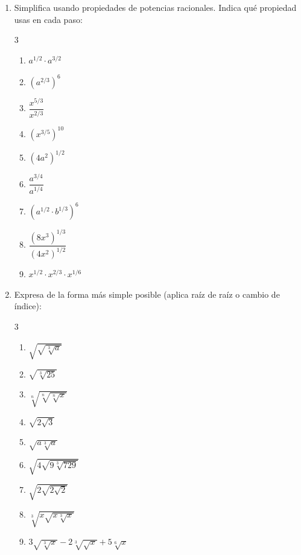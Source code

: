 \documentclass[11pt, letterpaper]{article}
\begin{document}
\begin{enumerate}[label=\textbf{\arabic*.}, leftmargin=*, resume]
  \item Simplifica usando propiedades de potencias racionales. Indica qué propiedad usas en cada paso:
  \begin{multicols}{3}
  \begin{enumerate}[label=\alph*)]
    \item $a^{1/2}\cdot a^{3/2}$
    \item $(a^{2/3})^6$
    \item $\dfrac{x^{5/3}}{x^{2/3}}$
    \item $(x^{3/5})^{10}$
    \item $(4a^2)^{1/2}$
    \item $\dfrac{a^{3/4}}{a^{1/4}}$
    \item $(a^{1/2}\cdot b^{1/3})^6$
    \item $\dfrac{(8x^3)^{1/3}}{(4x^2)^{1/2}}$
    \item $x^{1/2}\cdot x^{2/3}\cdot x^{1/6}$
  \end{enumerate}
  \end{multicols}

  \item Expresa de la forma más simple posible (aplica raíz de raíz o cambio de índice):
  \begin{multicols}{3}
  \begin{enumerate}[label=\alph*)]
    \item $\sqrt{\sqrt{\sqrt[3]{a}}}$
    \item $\sqrt{\sqrt[3]{25}}$
    \item $\sqrt[n]{\sqrt[n]{\sqrt[n]{x}}}$
    \item $\sqrt{2\sqrt{3}}$
    \item $\sqrt{a\sqrt[3]{a}}$
    \item $\sqrt{4\sqrt{9\sqrt[3]{729}}}$
    \item $\sqrt{2\sqrt{2\sqrt{2}}}$
    \item $\sqrt[3]{x\sqrt{x\sqrt[3]{x}}}$
    \item $3\sqrt{\sqrt[3]{x}}-2\sqrt[3]{\sqrt{x}}+5\sqrt[6]{x}$
  \end{enumerate}
  \end{multicols}


\end{enumerate}
\end{document}
